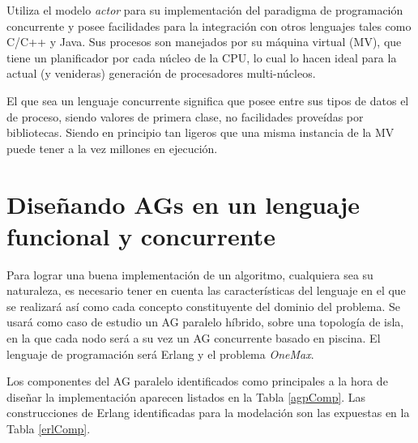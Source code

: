 \documentclass[runningheads]{llncs}
\begin{document}
Utiliza el modelo {\em actor} para su implementación del paradigma de programación concurrente y posee facilidades para la integración con otros lenguajes tales como C/C++ y Java. Sus procesos son manejados por su máquina virtual (MV), que tiene un planificador por cada núcleo de la CPU, lo cual lo hacen ideal para la actual (y venideras) generación de procesadores multi-núcleos.

El que sea un lenguaje concurrente significa que posee entre sus tipos de datos el de proceso, siendo valores de primera clase, no facilidades proveídas por bibliotecas. Siendo en principio tan ligeros que una misma instancia de la MV puede tener a la vez millones en ejecución.

\section{Diseñando AGs en un lenguaje funcional y concurrente}
\label{sec:design}

Para lograr una buena implementación de un algoritmo, cualquiera sea su naturaleza, es necesario tener en cuenta las características del lenguaje en el que se realizará así como cada concepto constituyente del dominio del problema. Se usará como caso de estudio un AG paralelo híbrido, sobre una topología de isla, en la que cada nodo será a su vez un AG concurrente basado en piscina. El lenguaje de programación será Erlang y el problema {\em OneMax}.

Los componentes del AG paralelo identificados como principales a la hora de diseñar la implementación aparecen listados en la Tabla \ref{agpComp}. Las construcciones de Erlang identificadas para la modelación son las expuestas en la Tabla \ref{erlComp}.
\end{document}
